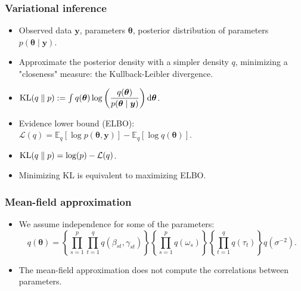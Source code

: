 \documentclass{beamer}
\DeclareMathOperator*{\KL}{{\rm KL}}
\begin{document}
\begin{frame}
\frametitle{Variational inference}
\begin{itemize}
\item Observed data $\boldsymbol{y}$, parameters $\boldsymbol{\theta}$, posterior distribution of parameters $p(\boldsymbol{\theta} \mid \boldsymbol{y})$.
\item Approximate the posterior density with a simpler density $q$, minimizing a "closeness" measure: the Kullback-Leibler divergence.
\item $\KL(q\parallel p) := \int q(\boldsymbol{\theta})\log \left(\dfrac{q(\boldsymbol{\theta})}{p(\boldsymbol{\theta} \mid \boldsymbol{y})}\right) \mathrm{d}\boldsymbol{\theta}$.
\item Evidence lower bound (ELBO): $\mathcal{L}(q) = \mathbb{E}_q\left[\log p(\boldsymbol{\theta},\boldsymbol{y})\right] - \mathbb{E}_q\left[\log q(\boldsymbol{\theta})\right]$.
\item $\KL(q\parallel p) = \log(p) - \mathcal{L}(q)$.
\item Minimizing KL is equivalent to maximizing ELBO.
\end{itemize}
\end{frame}

\begin{frame}
\frametitle{Mean-field approximation}
\begin{itemize}
\item We assume independence for some of the parameters:
$$
q(\boldsymbol{\theta}) = \left\lbrace\prod_{s=1}^p\prod_{t=1}^qq(\beta_{st},\gamma_{st})\right\rbrace\left\lbrace\prod_{s=1}^pq(\omega_s)\right\rbrace\left\lbrace\prod_{t=1}^qq(\tau_t)\right\rbrace q(\sigma^{-2}).
$$
\item The mean-field approximation does not compute the correlations between parameters.
\end{itemize}
\begin{figure}
\centering
{}\end{figure}
\end{frame}
\end{document}
